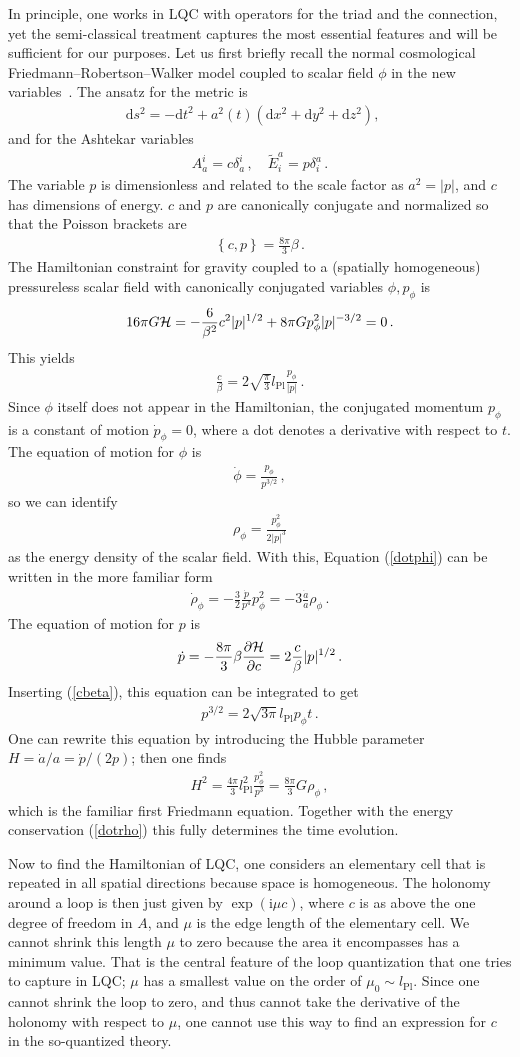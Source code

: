 \documentclass{article}
\def\beqn{\begin{eqnarray}}
\def\eeqn{\end{eqnarray}}
\begin{document}
In principle, one works in {\sc LQC} with operators for the triad and the connection, yet the semi-classical treatment
captures the most essential features and will be sufficient for our purposes. Let us first briefly recall the 
normal cosmological Friedmann--Robertson--Walker model coupled to scalar field $\phi$ in the new variables~\cite{Jorge}.
The ansatz for the metric is
\beqn
\mathrm{d}s^2 = - \mathrm{d}t^2 + a^2(t)\left( \mathrm{d}x^2 + \mathrm{d}y^2 + \mathrm{d}z^2 \right), \quad
\eeqn
and for the Ashtekar variables 
\beqn
A^i_a = c \delta^i_a \,, \quad \tilde E^a_i = p \delta^a_i \,.
\eeqn
The variable $p$ is dimensionless and related to the scale factor as $a^2 = |p|$, and $c$ has dimensions of energy. $c$ and $p$ are canonically 
conjugate and normalized so that the Poisson brackets are
\beqn
\left\{c,p\right\} = \frac{8\pi}{3} \beta \,.
\eeqn
The Hamiltonian constraint for gravity coupled to a (spatially homogeneous) pressureless scalar field with canonically conjugated 
variables $\phi,p_\phi$ is
\beqn
16 \pi G {\cal H} = - \frac{6}{\beta^2} c^2 |p|^{1/2} + 8 \pi G p^2_\phi |p|^{-3/2} = 0 \,. \label{frwham}
\eeqn
This yields
\beqn
\frac{c}{\beta} = 2 \sqrt{\frac{\pi}{3}} l_{\mathrm{Pl}} \frac{p_\phi}{|p|} \,. \label{cbeta}
\eeqn
Since $\phi$ itself does not appear in the Hamiltonian, the conjugated momentum $p_\phi$ is a constant of motion $\dot p_\phi = 0$, where
a dot denotes a derivative with respect to $t$. The equation of motion for $\phi$ is
\beqn
\dot \phi = \frac{p_\phi}{p^{3/2}} \,, \label{dotphi}
\eeqn
so we can identify 
\beqn
\rho_\phi = \frac{p_\phi^2}{2 |p|^3} 
\eeqn
as the energy density of the scalar field. With this, Equation (\ref{dotphi}) can be written in the more
familiar form
\beqn
\dot \rho_\phi = - \frac{3}{2} \frac{\dot p}{p^4} p_\phi^2 = -3 \frac{\dot a}{a} \rho_\phi \,. \label{dotrho}
\eeqn
The equation of motion for $p$ is
\beqn
\dot p = - \frac{8\pi}{3} \beta \frac{\partial {\cal H}}{\partial c} = 2 \frac{c}{\beta} |p|^{1/2} \,.
\eeqn
Inserting (\ref{cbeta}), this equation can be integrated to get
\beqn
p^{3/2} = 2 \sqrt{3 \pi} l_{\mathrm{Pl}} p_\phi t \,. \label{p32}
\eeqn
One can rewrite this equation by introducing the Hubble parameter $H = \dot a/a = \dot p/(2 p)$; then one finds
\beqn
H^2 = \frac{4 \pi}{3} l_{\mathrm{Pl}}^2 \frac{p_\phi^2}{p^3} = \frac{8 \pi}{3} G \rho_\phi \,,
\eeqn
which is the familiar first Friedmann equation. Together with the energy conservation (\ref{dotrho}) this fully 
determines the time evolution.

Now to find the Hamiltonian of {\sc LQC}, one considers an elementary cell that is repeated in all spatial directions because space is homogeneous. The holonomy around a loop is then just given by $\exp( \mathrm{i} \mu c )$,
where $c$ is as above the one degree of freedom in $A$, and $\mu$ is the edge length of the elementary
cell. We cannot shrink this length $\mu$ to zero because the area it encompasses has a minimum value. That
is the central feature of the loop quantization that one tries to capture in {\sc LQC}; $\mu$ 
has a smallest value on the order of $\mu_0 \sim l_{\mathrm{Pl}}$. Since one cannot shrink
the loop to zero, and thus cannot take the derivative of the holonomy with respect to $\mu$, one cannot use
this way to find an expression for $c$ in the so-quantized theory.
\end{document}

